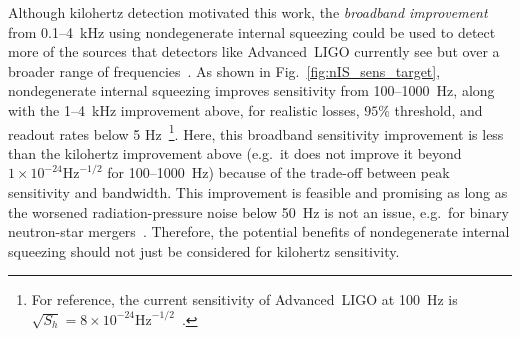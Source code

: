 Although kilohertz detection motivated this work, the \emph{broadband improvement} from 0.1--4~kHz using nondegenerate internal squeezing could be used to detect more of the sources that detectors like Advanced~LIGO currently see but over a broader range of frequencies~\cite{GWTC-2:2020}. %
As shown in Fig.~\ref{fig:nIS_sens_target}, nondegenerate internal squeezing improves sensitivity from 100--1000~Hz, along with the 1--4~kHz improvement above, for realistic losses, $95\%$ threshold, and readout rates below 5 Hz~\footnote{For reference, the current sensitivity of Advanced~LIGO at 100~Hz is $\sqrt{S_h}=8\times10^{-24}\text{Hz}^{-1/2}$~\cite{PhysRevD.93.112004}.}. Here, this broadband sensitivity improvement is less than the kilohertz improvement above (e.g.\ it does not improve it beyond $1\times10^{-24}\text{Hz}^{-1/2}$ for 100--1000~Hz) because of the trade-off between peak sensitivity and bandwidth. This improvement is feasible and promising as long as the worsened radiation-pressure noise below 50~Hz is not an issue, e.g.\ for binary neutron-star mergers~\cite{miaoDesignGravitationalWaveDetectors2018}. Therefore, the potential benefits of nondegenerate internal squeezing should not just be considered for kilohertz sensitivity.




